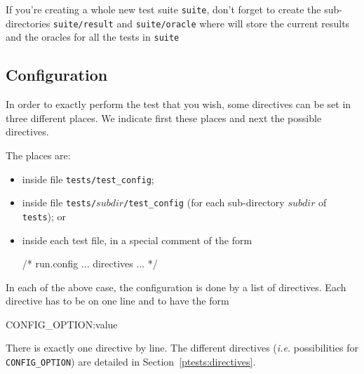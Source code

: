 \begin{important}
If you're creating a whole new test suite \texttt{suite}, 
don't forget to create the sub-directories \texttt{suite/result} and
\texttt{suite/oracle} where \ptests will store the current results and
the oracles for all the tests in \texttt{suite}
\end{important}

\subsection{Configuration}\label{ptests:configuration}

In order to exactly perform the test that you wish, some directives can be set
in three different places. We indicate first these places and next the possible
directives.

The places are:
\begin{itemize}
\item inside file \texttt{tests/test\_config};
\item inside file \texttt{tests/$subdir$/test\_config} (for each sub-directory
  $subdir$ of \texttt{tests}); or
\item inside each test file, in a special comment of the
  form
\begin{listing-nonumber}
/* run.config
   ... directives ...
*/
\end{listing-nonumber}
\end{itemize}

In each of the above case, the configuration is done by a list of
directives. Each directive has to be on one line and to
have the form
\begin{listing-nonumber}
CONFIG_OPTION:value
\end{listing-nonumber}
There is exactly one directive by line. The different directives (\emph{i.e.}
possibilities for \texttt{CONFIG\_OPTION}) are detailed in
Section~\ref{ptests:directives}.

